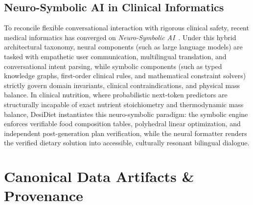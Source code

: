 \documentclass[5p,times,twocolumn]{elsarticle}
\makeatletter
\def\systemname{DesiDiet}%
\def\my@bx{bx}
\def\my@b{b}
\DeclareRobustCommand{\systemname}{%
  \texorpdfstring{%
    \ifx\f@series\my@bx
      DesiDiet%
    \else\ifx\f@series\my@b
      DesiDiet%
    \else
      \textsc{DesiDiet}%
    \fi\fi
  }{DesiDiet}%
}
\makeatother
\begin{document}
\subsection{Neuro-Symbolic AI in Clinical Informatics}
To reconcile flexible conversational interaction with rigorous clinical safety, recent medical informatics has converged on \textit{Neuro-Symbolic AI}~\cite{pan2024roadmap, miao2024clinical}. Under this hybrid architectural taxonomy, neural components (such as large language models) are tasked with empathetic user communication, multilingual translation, and conversational intent parsing, while symbolic components (such as typed knowledge graphs, first-order clinical rules, and mathematical constraint solvers) strictly govern domain invariants, clinical contraindications, and physical mass balance. In clinical nutrition, where probabilistic next-token predictors are structurally incapable of exact nutrient stoichiometry and thermodynamic mass balance, \systemname{} instantiates this neuro-symbolic paradigm: the symbolic engine enforces verifiable food composition tables, polyhedral linear optimization, and independent post-generation plan verification, while the neural formatter renders the verified dietary solution into accessible, culturally resonant bilingual dialogue.

\section{Canonical Data Artifacts \& Provenance}
\label{sec:data_provenance}
\end{document}

